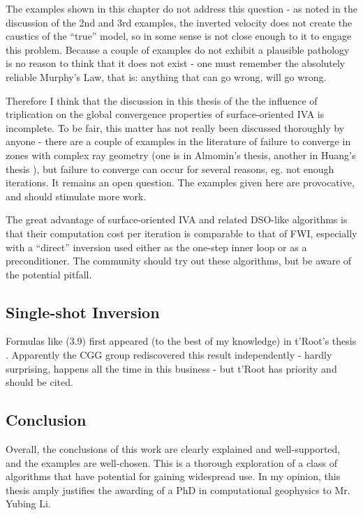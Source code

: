 The examples shown in this chapter do not address this question - as noted in the discussion of the 2nd and 3rd examples, the inverted velocity does not create the caustics of the ``true'' model, so in some sense is not close enough to it to engage this problem. Because a couple of examples do not exhibit a plausible pathology is no reason to think that it does not exist - one must remember the absolutely reliable Murphy's Law, that is: anything that can go wrong, will go wrong.

Therefore I think that the discussion in this thesis of the the influence of triplication on the global convergence properties of surface-oriented IVA is incomplete. To be fair, this matter has not really been discussed thoroughly by anyone - there are a couple of examples in the literature of failure to converge in zones with complex ray geometry (one is in Almomin's thesis, another in Huang's thesis \cite[]{HuangSymes:SEG15,YinHuang:16}), but failure to converge can occur for several reasons, eg. not enough iterations. It remains an open question. The examples given here are provocative, and should stimulate more work.

The great advantage of surface-oriented IVA and related DSO-like algorithms is that their computation cost per iteration is comparable to that of FWI, especially with a ``direct'' inversion used either as the one-step inner loop or as a preconditioner.  The community should try out these algorithms, but be aware of the potential pitfall.

\subsection{Single-shot Inversion}
Formulas like (3.9) first appeared (to the best of my knowledge) in t'Root's thesis 
\cite[]{RootStolkHoop:SEG09,RootStolkHoop:12}. Apparently the CGG group rediscovered this result independently - hardly surprising, happens all the time in this business - but t'Root has priority and should be cited.

\subsection{Conclusion}
Overall, the conclusions of this work are clearly explained and well-supported, and the examples are well-chosen. This is a thorough exploration of a class of algorithms that have potential for gaining widespread use. In my opinion, this thesis amply justifies the awarding of a PhD in computational geophysics to Mr. Yubing Li.


